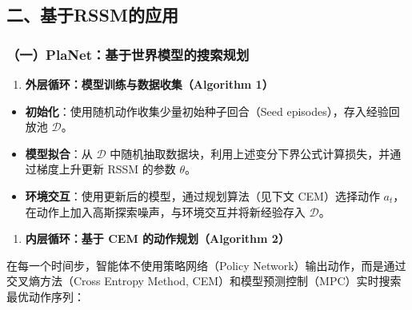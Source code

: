 \hypertarget{ux4e8cux57faux4e8erssmux7684ux5e94ux7528}{%
\subsection{二、基于RSSM的应用}\label{ux4e8cux57faux4e8erssmux7684ux5e94ux7528}}

\hypertarget{ux4e00planetux57faux4e8eux4e16ux754cux6a21ux578bux7684ux641cux7d22ux89c4ux5212}{%
\subsubsection{（一）PlaNet：基于世界模型的搜索规划}\label{ux4e00planetux57faux4e8eux4e16ux754cux6a21ux578bux7684ux641cux7d22ux89c4ux5212}}

\begin{enumerate}
\def\labelenumi{\arabic{enumi}.}
\tightlist
\item
  \textbf{外层循环：模型训练与数据收集（Algorithm 1）}
\end{enumerate}

\begin{itemize}
\tightlist
\item
  \textbf{初始化}：使用随机动作收集少量初始种子回合（Seed episodes），存入经验回放池 \(\mathcal{D}\)。
\item
  \textbf{模型拟合}：从 \(\mathcal{D}\) 中随机抽取数据块，利用上述变分下界公式计算损失，并通过梯度上升更新 RSSM 的参数 \(\theta\)。
\item
  \textbf{环境交互}：使用更新后的模型，通过规划算法（见下文 CEM）选择动作 \(a_t\)，在动作上加入高斯探索噪声，与环境交互并将新经验存入 \(\mathcal{D}\)。
\end{itemize}

\begin{enumerate}
\def\labelenumi{\arabic{enumi}.}
\setcounter{enumi}{1}
\tightlist
\item
  \textbf{内层循环：基于 CEM 的动作规划（Algorithm 2）}
\end{enumerate}

在每一个时间步，智能体不使用策略网络（Policy Network）输出动作，而是通过交叉熵方法（Cross Entropy Method, CEM）和模型预测控制（MPC）实时搜索最优动作序列：

